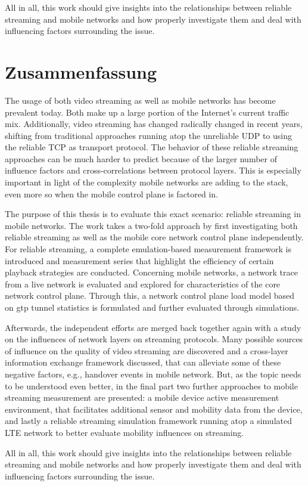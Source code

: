 All in all, this work should give insights into the relationships between reliable streaming and mobile networks and how properly investigate them and deal with influencing factors surrounding the issue.


\chapter*{Zusammenfassung}
%

The usage of both video streaming as well as mobile networks has become prevalent today. Both make up a large portion of the Internet's current traffic mix. Additionally, video streaming has changed radically changed in recent years, shifting from traditional approaches running atop the unreliable \acrshort{UDP} to using the reliable \acrshort{TCP} as transport protocol. The behavior of these reliable streaming approaches can be much harder to predict because of the larger number of influence factors and cross-correlations between protocol layers. This is especially important in light of the complexity mobile networks are adding to the stack, even more so when the mobile control plane is factored in.

The purpose of this thesis is to evaluate this exact scenario: reliable streaming in mobile networks. The work takes a two-fold approach by first investigating both reliable streaming as well as the mobile core network control plane independently. For reliable streaming, a complete emulation-based measurement framework is introduced and measurement series that highlight the efficiency of certain playback strategies are conducted. Concerning mobile networks, a network trace from a live network is evaluated and explored for characteristics of the core network control plane. Through this, a network control plane load model based on \acrshort{gtp} tunnel statistics is formulated and further evaluated through simulations.

Afterwards, the independent efforts are merged back together again with a study on the influences of network layers on streaming protocols. Many possible sources of influence on the quality of video streaming are discovered and a cross-layer information exchange framework discussed, that can alleviate some of these negative factors, e.g., handover events in mobile network. But, as the topic needs to be understood even better, in the final part two further approaches to mobile streaming measurement are presented: a mobile device active measurement environment, that facilitates additional sensor and mobility data from the device, and lastly a reliable streaming simulation framework running atop a simulated \acrshort{LTE} network to better evaluate mobility influences on streaming.

All in all, this work should give insights into the relationships between reliable streaming and mobile networks and how properly investigate them and deal with influencing factors surrounding the issue.